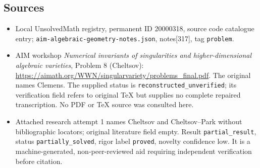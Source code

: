 \documentclass[11pt]{article}
\begin{document}
\subsection{Sources}
\begin{itemize}
\item Local UnsolvedMath registry, permanent ID 20000318, source code catalogue entry; \texttt{aim-algebraic-geometry-notes.json}, notes[317], tag \texttt{problem}.
\item AIM workshop \emph{Numerical invariants of singularities and higher-dimensional algebraic varieties}, Problem 8 (Cheltsov): \url{https://aimath.org/WWN/singularvariety/problems_final.pdf}. The original names Clemens. The supplied status is \texttt{reconstructed\_unverified}; its verification field refers to original TeX but supplies no complete repaired transcription. No PDF or TeX source was consulted here.
\item Attached research attempt 1 names Cheltsov and Cheltsov--Park without bibliographic locators; original literature field empty. Result \texttt{partial\_result}, status \texttt{partially\_solved}, rigor label \texttt{proved}, novelty confidence low. It is a machine-generated, non-peer-reviewed aid requiring independent verification before citation.
\end{itemize}
\end{document}
